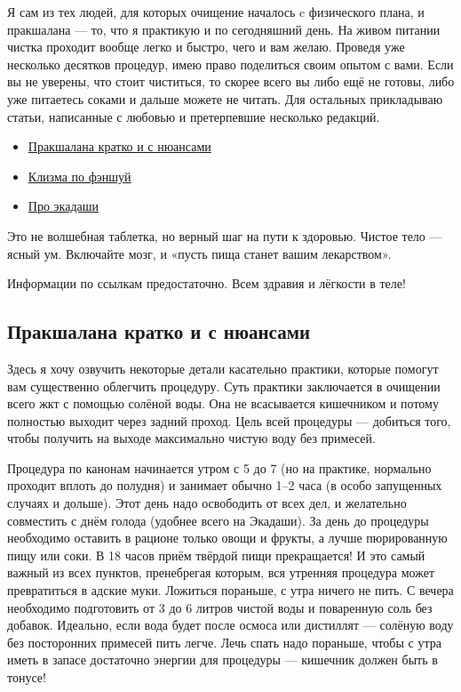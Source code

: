 Я сам из тех людей, для которых очищение началось c физического плана, и пракшалана — то, что я практикую и по сегодняшний день. На живом питании чистка проходит вообще легко и быстро, чего и вам желаю. Проведя уже несколько десятков процедур, имею право поделиться своим опытом с вами. Если вы не уверены, что стоит чиститься, то скорее всего вы либо ещё не готовы, либо уже питаетесь соками и дальше можете не читать. Для остальных прикладываю статьи, написанные с любовью и претерпевшие несколько редакций.
\begin{itemize}
    \item \hyperref[fasting1]{Пракшалана кратко и с нюансами}
    \item \hyperref[fasting2]{Клизма по фэншуй}
    \item \hyperref[fasting3]{Про экадаши}
\end{itemize}

Это не волшебная таблетка, но верный шаг на пути к здоровью. Чистое тело — ясный ум. Включайте мозг, и «пусть пища станет вашим лекарством». 

Информации по ссылкам предостаточно. 
Всем здравия и лёгкости в теле!

\subsection{Пракшалана кратко и с нюансами}\label{fasting1}
Здесь я хочу озвучить некоторые детали касательно практики, которые помогут вам существенно облегчить процедуру.
Суть практики заключается в очищении всего жкт с помощью солёной воды. Она не всасывается кишечником и потому полностью выходит через задний проход. Цель всей процедуры — добиться того, чтобы получить на выходе максимально чистую воду без примесей.

Процедура по канонам начинается утром с 5 до 7 (но на практике, нормально проходит вплоть до полудня) и занимает обычно 1–2 часа (в особо запущенных случаях и дольше). Этот день надо освободить от всех дел, и желательно совместить с днём голода (удобнее всего на Экадаши). За день до процедуры необходимо оставить в рационе только овощи и фрукты, а лучше пюрированную пищу или соки. В 18 часов приём твёрдой пищи прекращается! И это самый важный из всех пунктов, пренебрегая которым, вся утренняя процедура может превратиться в адские муки. Ложиться пораньше, с утра ничего не пить.
С вечера необходимо подготовить от 3 до 6 литров чистой воды и поваренную соль без добавок. Идеально, если вода будет после осмоса или дистиллят — солёную воду без посторонних примесей пить легче. Лечь спать надо пораньше, чтобы с утра иметь в запасе достаточно энергии для процедуры — кишечник должен быть в тонусе!

